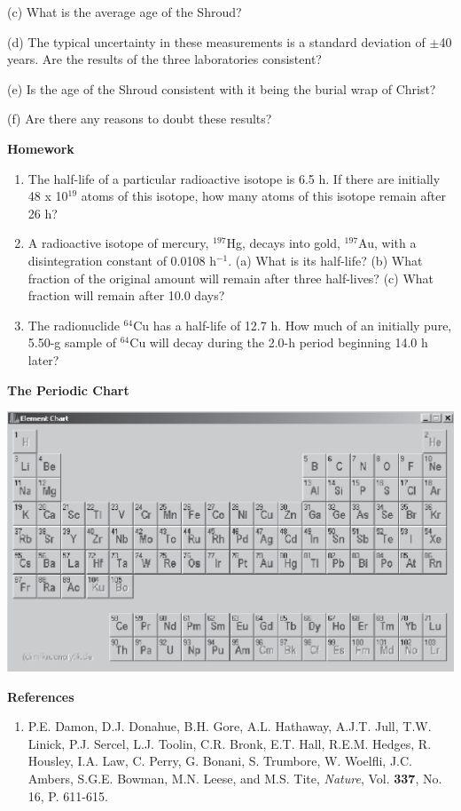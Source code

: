 \answerspace{3.5in}
(c) What is the average age of the Shroud? 
\answerspace{1in}

(d) The typical uncertainty in these measurements is a standard deviation
of \( \pm  \)40 years. Are the results of the three laboratories
consistent? 
\answerspace{1in}

\pagebreak
(e) Is the age of the Shroud consistent with it being the burial wrap
of Christ? 
\vspace{1in}

(f) Are there any reasons to doubt these results?
\vspace{1in}

\textbf{Homework} 

\begin{enumerate}
\item The half-life of a particular radioactive isotope is 6.5 h. If there
are initially 48 x 10\( ^{19} \) atoms of this isotope, how many
atoms of this isotope remain after 26 h? 
\item A radioactive isotope of mercury, \( ^{197} \)Hg, decays into gold,
\( ^{197} \)Au, with a disintegration constant of 0.0108 h\( ^{-1} \).
(a) What is its half-life? (b) What fraction of the original amount
will remain after three half-lives? (c) What fraction will remain
after 10.0 days?
\item The radionuclide \( ^{64} \)Cu has a half-life of 12.7 h. How much
of an initially pure, 5.50-g sample of \( ^{64} \)Cu will decay during
the 2.0-h period beginning 14.0 h later? 
\end{enumerate}

\textbf{The Periodic Chart} 

\begin{center}
\includegraphics[width=5.5in]{radiocarbon_dating/pertable3_bw.eps}
\end{center}

\textbf{References}

\begin{enumerate}
\item P.E. Damon, D.J. Donahue, B.H. Gore, A.L. Hathaway, A.J.T. Jull, T.W. Linick,
P.J. Sercel, L.J. Toolin, C.R. Bronk, E.T. Hall, R.E.M. Hedges, R. Housley,
I.A. Law, C. Perry, G. Bonani, S. Trumbore, W. Woelfli, J.C. Ambers, S.G.E. Bowman,
M.N. Leese, and M.S. Tite, \emph{Nature}, Vol. \textbf{337}, No. 16,
P. 611-615.\end{enumerate}

